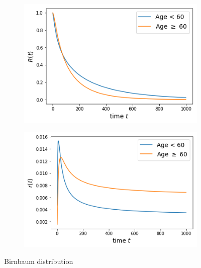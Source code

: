 \documentclass[10pt]{article}
\begin{document}
    \begin{figure}[htb!]
\centering
    \begin{subfigure}{.4\linewidth}
    \centering
    \includegraphics[width=.99\textwidth]{Images/age/Sbir.png}
  \end{subfigure}%
    \begin{subfigure}{.4\linewidth}
    \centering
    \includegraphics[width=.99\textwidth]{Images/age/rbir.png}
  \end{subfigure}%
  \caption{Birnbaum distribution}\label{fig:karexp} 
   \end{figure} 
   
\end{document}
